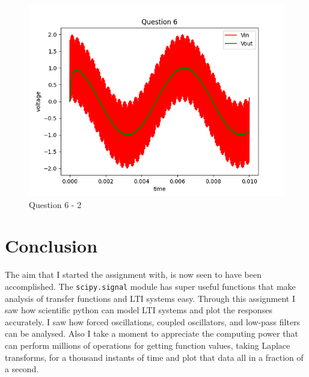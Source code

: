 \documentclass[11pt, a4paper]{article}
\begin{document}
\begin{figure}[!tbh]
   	\centering
  \includegraphics[scale=0.5]{Q6-2.png} 
    \caption{Question 6 - 2} 	
    \label{q6-2}
   \end{figure} 

\section{Conclusion}
The aim that I started the assignment with, is now seen to have been accomplished. The \texttt{scipy.signal} module has super useful functions that make analysis of transfer functions and LTI systems easy. Through this assignment I saw how scientific python can model LTI systems and plot the responses accurately. I saw how forced oscillations, coupled oscillators, and low-pass filters can be analysed. Also I take a moment to appreciate the computing power that can perform millions of operations for getting function values, taking Laplace transforms, for a thousand instants of time and plot that data all in a fraction of a second.   
\end{document}
